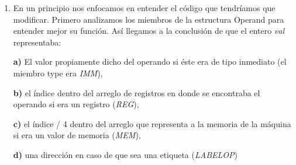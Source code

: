 \documentclass[a4paper,12pt]{article}
\begin{document}
\begin{enumerate}
\item 
En un principio nos enfocamos en entender el c\'odigo que tendr\'iamos que modificar. Primero analizamos los miembros de la estructura Operand para entender mejor su funci\'on. As\'i llegamos a la conclusi\'on de que el entero \emph{val} representaba:
 
	\textbf{a)} El valor propiamente dicho del operando si \'este era de tipo inmediato (el miembro type era \emph{IMM}),
	
	\textbf{b)} el \'indice dentro del arreglo de registros en donde se encontraba el operando si era un registro (\emph{REG}),
	
	\textbf{c)} el \'indice / 4 dentro del arreglo que representa a la memoria de la m\'aquina si era un valor de memoria (\emph{MEM}),
	
	\textbf{d)} una direcci\'on en caso de que sea una etiqueta (\emph{LABELOP})\\


\end{enumerate}
\end{document}
